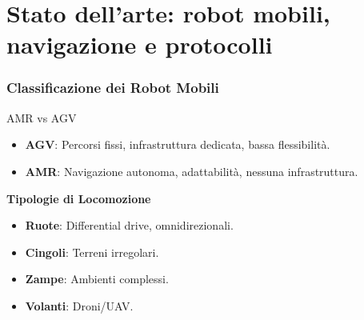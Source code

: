 \section{Stato dell'arte: robot mobili, navigazione e protocolli}

\begin{frame}
    \frametitle{Classificazione dei Robot Mobili}

    \begin{block}{AMR vs AGV}
        \begin{itemize}
            \item \textbf{AGV}: Percorsi fissi, infrastruttura dedicata, bassa flessibilità.
            \item \textbf{AMR}: Navigazione autonoma, adattabilità, nessuna infrastruttura.
        \end{itemize}
    \end{block}


    \textbf{Tipologie di Locomozione}
    \begin{itemize}
        \item \textbf{Ruote}: Differential drive, omnidirezionali.
        \item \textbf{Cingoli}: Terreni irregolari.
        \item \textbf{Zampe}: Ambienti complessi.
        \item \textbf{Volanti}: Droni/UAV.
    \end{itemize}

\end{frame}


